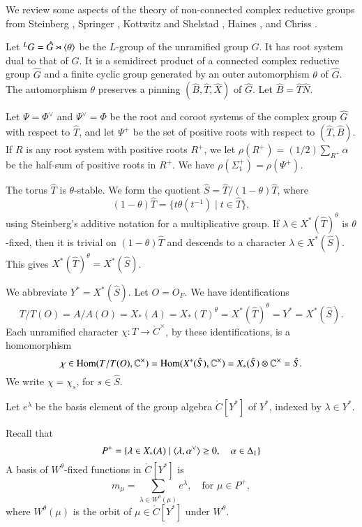 We review some aspects of the theory of non-connected complex
reductive groups from Steinberg \cite{steinberg1968endomorphisms},
Springer \cite{springer2010linear}, Kottwitz and Shelstad
\cite{kottwitz1999foundations}, Haines \cite{haines2016dualities}, and
Chriss \cite{chriss}.

Let ${}^LG = \hat G \rtimes \langle{\theta}\rangle$ be the $L$-group of the
unramified group $G$.  It has root system dual to that of $G$.  It is
a semidirect product of a connected complex reductive group $\hat G$
and a finite cyclic group generated by an outer automorphism $\theta$
of $\hat G$.  The automorphism $\theta$ preserves a pinning $(\hat
B,\hat T,\hat X)$ of $\hat G$. Let $\hat B = \hat T\hat N$.

Let $\Psi=\Phi^\vee$ and $\Psi^\vee=\Phi$ be the root and coroot
systems of the complex group $\hat G$ with respect to $\hat T$, and
let $\Psi^+$ be the set of positive roots with respect to $(\hat
T,\hat B)$.  If $R$ is any root system with positive roots $R^+$, we
let $\rho(R^+) = (1/2)\sum_{R^+} \alpha$ be the half-sum of positive roots in $R^+$.  We have
$\rho(\Sigma^+_1) = \rho(\Psi^+)$.

The torus $\hat T$ is $\theta$-stable.  We form the quotient $\hat S =
\hat T/(1-\theta) \hat T$, where
\[
(1-\theta)\hat T = \{ t\theta(t^{-1}) \mid t\in \hat T\},
\]
using Steinberg's additive notation for a multiplicative group.  If $\lambda\in
X^*(\hat T)^\theta$ is $\theta$-fixed, then it is trivial on
$(1-\theta)\hat T$ and descends to a character $\lambda\in X^*(\hat
S)$.  This gives $X^*(\hat T)^\theta = X^*(\hat S)$.

We abbreviate $Y^* = X^*(\hat S)$. Let $O=O_F$.  We have
identifications
\begin{equation}\label{eqn:identify}
T/T(O)=A/A(O)=X_*(A)=X_*(T)^\theta  =X^*(\hat T)^\theta = Y^* = X^*(\hat S).
\end{equation}
Each unramified character $\chi:T\to \ring{C}^\times$, by these
identifications, is a homomorphism
\begin{equation}
\chi\in{\operatorname{Hom}}(T/T(O),\mathbb{C}^\times) = 
{\operatorname{Hom}}(X^*(\hat S),\mathbb{C}^\times) = 
X_*(\hat S)\otimes \mathbb{C}^\times = \hat S.
\end{equation}
We write $\chi = \chi_s$, for $s\in\hat S$.

Let $e^\lambda$ be the basis element of the group algebra
$\ring{C}[Y^*]$ of $Y^*$, indexed by $\lambda\in Y^*$.

Recall that
\[
P^+ = \{\lambda\in X_*(A) \mid \langle{\lambda,\alpha^\vee}\rangle\ge 0,
\quad \alpha\in \Delta_1\}
\]
A basis of $W^\theta$-fixed functions in $\ring{C}[Y^*]$ is
\[
m_\mu = \sum_{\lambda\in W^\theta(\mu)} e^\lambda, 
\quad \text{for }\mu\in P^+,
\]
where $W^\theta(\mu)$ is the orbit of $\mu\in\ring{C}[Y^*]$ under
$W^\theta$.

